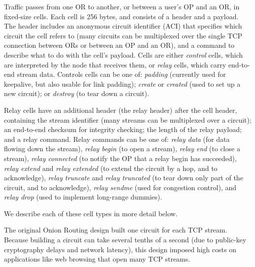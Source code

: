 \documentclass[times,10pt,twocolumn]{article}
\begin{document}
\label{subsec:cells}


Traffic passes from one OR to another, or between a user's OP and an OR,
in fixed-size cells. Each cell is 256
bytes, and consists of a header and a payload. The header includes an
anonymous circuit identifier (ACI) that specifies which circuit the
cell refers to
(many circuits can be multiplexed over the single TCP connection between
ORs or between an OP and an OR), and a command to describe what to do
with the cell's payload. Cells are either \emph{control} cells, which are
interpreted by the node that receives them, or \emph{relay} cells,
which carry end-to-end stream data. Controls cells can be one of:
\emph{padding} (currently used for keepalive, but also usable for link
padding); \emph{create} or \emph{created} (used to set up a new circuit);
or \emph{destroy} (to tear down a circuit).

Relay cells have an additional header (the relay header) after the
cell header, containing the stream identifier (many streams can
be multiplexed over a circuit); an end-to-end checksum for integrity
checking; the length of the relay payload; and a relay command. Relay
commands can be one of: \emph{relay
data} (for data flowing down the stream), \emph{relay begin} (to open a
stream), \emph{relay end} (to close a stream), \emph{relay connected}
(to notify the OP that a relay begin has succeeded), \emph{relay
extend} and \emph{relay extended} (to extend the circuit by a hop,
and to acknowledge), \emph{relay truncate} and \emph{relay truncated}
(to tear down only part of the circuit, and to acknowledge), \emph{relay
sendme} (used for congestion control), and \emph{relay drop} (used to
implement long-range dummies).

We describe each of these cell types in more detail below.


\label{subsec:circuits}


The original Onion Routing design built one circuit for each
TCP stream.  Because building a circuit can take several tenths of a
second (due to public-key cryptography delays and network latency),
this design imposed high costs on applications like web browsing that
open many TCP streams.
\end{document}
